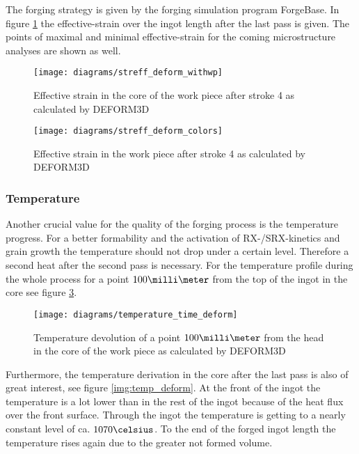 The forging strategy is given by the forging simulation program ForgeBase. In figure \ref{img:streff_deform} the effective-strain over the ingot length after the last pass is given. The points of maximal and minimal effective-strain for the coming microstructure analyses are shown as well.

\begin{figure}[tb]
  \centering
  \texttt{[image: diagrams/streff\_deform\_withwp]}
  \caption{Effective strain in the core of the work piece after stroke 4 as calculated by DEFORM3D}
  \label{img:streff_deform}
\end{figure}

\begin{figure}[tb]
  \centering
  \texttt{[image: diagrams/streff\_deform\_colors]}
  \caption{Effective strain in the work piece after stroke 4 as calculated by DEFORM3D}
  \label{img:streff_deform_colors}
\end{figure}

\subsubsection{Temperature}

Another crucial value for the quality of the forging process is the temperature progress. For a better formability and the activation of RX-/SRX-kinetics and grain growth the temperature should not drop under a certain level. Therefore a second heat after the second pass is necessary. For the temperature profile during the whole process for a point $100\milli\meter$ from the top of the ingot in the core see figure \ref{img:temp_time_deform}.

\begin{figure}[tb]
  \centering
  \texttt{[image: diagrams/temperature\_time\_deform]}
  \caption{Temperature devolution of a point $100\milli\meter$ from the head in the core of the work piece as calculated by DEFORM3D}
  \label{img:temp_time_deform}
\end{figure}

Furthermore, the temperature derivation in the core after the last pass is also of great interest, see figure \ref{img:temp_deform}. At the front of the ingot the temperature is a lot lower than in the rest of the ingot because of the heat flux over the front surface. Through the ingot the temperature is getting to a nearly constant level of ca. $1070\celsius$. To the end of the forged ingot length the temperature rises again due to the greater not formed volume.

